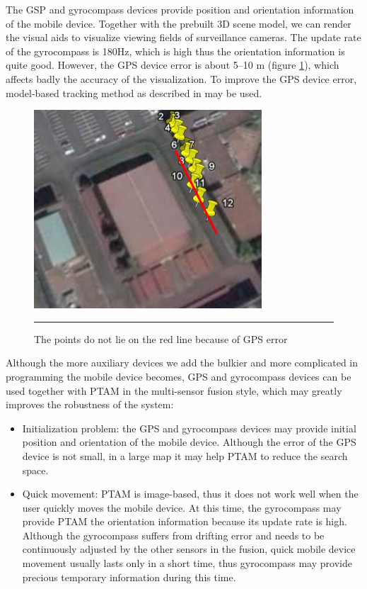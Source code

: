 The GSP and gyrocompass devices provide position and orientation information of the mobile device. Together with the prebuilt 3D scene model, we can render the visual aids to visualize viewing fields of surveillance cameras. The update rate of the gyrocompass is 180Hz, which is high thus the orientation information is quite good. However, the GPS device error is about 5--10 m (figure \ref{fig:GPSError}), which affects badly the accuracy of the visualization. To improve the GPS device error, model-based tracking method as described in \cite{Reference13} may be used.


\begin{figure}[htbp]
	\centering
	\includegraphics{./Primitives/gps_error.png}
	\rule{35em}{0.5pt}
	\caption[GPS error]{The points do not lie on the red line because of GPS error}
	\label{fig:GPSError}
\end{figure}

Although the more auxiliary devices we add the bulkier and more complicated in programming the mobile device becomes, GPS and gyrocompass devices can be used together with PTAM in the multi-sensor fusion \cite{Reference14} style, which may greatly improves the robustness of the system:

\begin{itemize}
	\item Initialization problem: the GPS and gyrocompass devices may provide initial position and orientation of the mobile device. Although the error of the GPS device is not small, in a large map it may help PTAM to reduce the search space.
	\item Quick movement: PTAM is image-based, thus it does not work well when the user quickly moves the mobile device. At this time, the gyrocompass may provide PTAM the orientation information because its update rate is high. Although the gyrocompass suffers from drifting error and needs to be continuously adjusted by the other sensors in the fusion, quick mobile device movement usually lasts only in a short time, thus gyrocompass may provide precious temporary information during this time.
\end{itemize}

